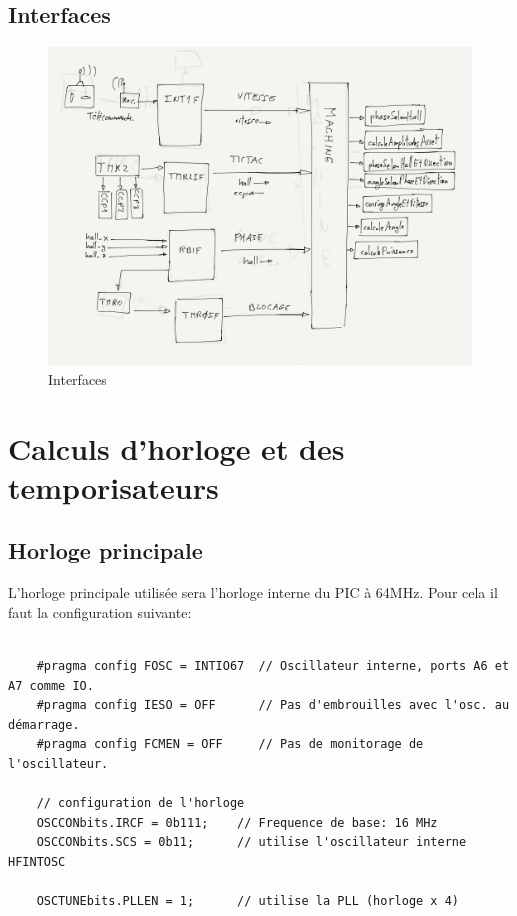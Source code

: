 \documentclass[fleqn, 11pt, a4paper]{article}
\begin{document}
  \subsection{Interfaces}
  \begin{figure}[H]
    \centering
    \includegraphics[width=16cm]{main_view_interfaces}
    \caption{Interfaces}
    \label{fig:interfaces}
  \end{figure}

\section{Calculs d'horloge et des temporisateurs}
  \subsection{Horloge principale}
  L'horloge principale utilisée sera l'horloge interne du PIC à 64MHz.
  Pour cela il faut la configuration suivante:
  \begin{lstlisting}[caption=Configuration de l'horloge principale, label=lst:clock_config]

    #pragma config FOSC = INTIO67  // Oscillateur interne, ports A6 et A7 comme IO.
    #pragma config IESO = OFF      // Pas d'embrouilles avec l'osc. au démarrage.
    #pragma config FCMEN = OFF     // Pas de monitorage de l'oscillateur.

    // configuration de l'horloge
    OSCCONbits.IRCF = 0b111;    // Frequence de base: 16 MHz
    OSCCONbits.SCS = 0b11;      // utilise l'oscillateur interne HFINTOSC
    
    OSCTUNEbits.PLLEN = 1;      // utilise la PLL (horloge x 4)    
  
  \end{lstlisting}
  
\end{document}
